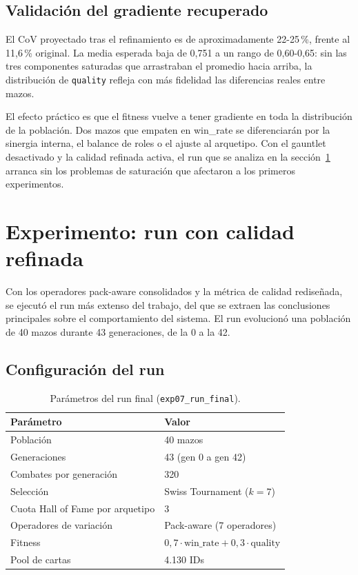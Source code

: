 \subsection{Validación del gradiente recuperado}

El CoV proyectado tras el refinamiento es de aproximadamente 22-25\,\%, frente al 11,6\,\% original. La media esperada baja de 0,751 a un rango de 0,60-0,65: sin las tres componentes saturadas que arrastraban el promedio hacia arriba, la distribución de \texttt{quality} refleja con más fidelidad las diferencias reales entre mazos.

El efecto práctico es que el fitness vuelve a tener gradiente en toda la distribución de la población. Dos mazos que empaten en win\_rate se diferenciarán por la sinergia interna, el balance de roles o el ajuste al arquetipo. Con el gauntlet desactivado y la calidad refinada activa, el run que se analiza en la sección~\ref{sec:run-final} arranca sin los problemas de saturación que afectaron a los primeros experimentos.

\section{Experimento: run con calidad refinada}
\label{sec:run-final}

Con los operadores pack-aware consolidados y la métrica de calidad rediseñada, se ejecutó el run más extenso del trabajo, del que se extraen las conclusiones principales sobre el comportamiento del sistema. El run evolucionó una población de 40 mazos durante 43 generaciones, de la 0 a la 42.

\subsection{Configuración del run}

\begin{table}[H]
\centering
\caption{Parámetros del run final (\texttt{exp07\_run\_final}).}
\label{tab:config-final}
\begin{tabular}{ll}
\toprule
\textbf{Parámetro} & \textbf{Valor} \\
\midrule
Población & 40 mazos \\
Generaciones & 43 (gen 0 a gen 42) \\
Combates por generación & 320 \\
Selección & Swiss Tournament ($k=7$) \\
Cuota Hall of Fame por arquetipo & 3 \\
Operadores de variación & Pack-aware (7 operadores) \\
Fitness & $0{,}7 \cdot \text{win\_rate} + 0{,}3 \cdot \text{quality}$ \\
Pool de cartas & 4.130 IDs \\
\bottomrule
\end{tabular}
\end{table}

